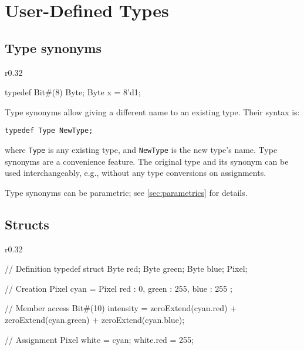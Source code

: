 \section{User-Defined Types}
\label{sec:userdefined}

\subsection{Type synonyms}
\label{sec:synonyms}

\begin{wrapfigure}{r}{0.32\columnwidth}
\vspace{-2em}
\begin{mscode}
typedef Bit#(8) Byte;
Byte x = 8'd1;
\end{mscode}
\vspace{-2em}
\end{wrapfigure}

Type synonyms allow giving a different name to an existing type. Their syntax is:
\begin{center}
\verb|typedef Type NewType;|
\end{center}
where \verb|Type| is any existing type, and \verb|NewType| is the new type's name.
Type synonyms are a convenience feature. The original type and its synonym can be used interchangeably,
e.g., without any type conversions on assignments.

Type synonyms can be parametric; see \autoref{sec:parametrics} for details.

\subsection{Structs}
\label{sec:structs}

\begin{wrapfigure}{r}{0.32\columnwidth}
\vspace{-2em}
\begin{mscode}
// Definition
typedef struct {
  Byte red;
  Byte green;
  Byte blue;
} Pixel;

// Creation
Pixel cyan = Pixel{
  red : 0,
  green : 255,
  blue : 255
};

// Member access
Bit#(10) intensity =
  zeroExtend(cyan.red) +
  zeroExtend(cyan.green) +
  zeroExtend(cyan.blue);

// Assignment
Pixel white = cyan;
white.red = 255;
\end{mscode}
\vspace{-6em}
\end{wrapfigure}

